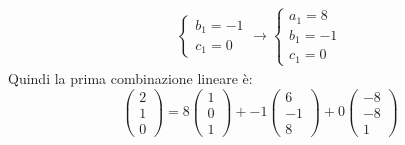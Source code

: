 \documentclass[a4paper]{article}
\begin{document}
\begin{itemize}
\begin{equation*}
\begin{array}{l}
\begin{cases}
					b_{1} = -1 \\
					c_{1} = 0
				\end{cases} \rightarrow
				\begin{cases}
					a_{1} =  8 \\
					b_{1} = -1 \\
					c_{1} =  0
				\end{cases}
			\end{array}
		\end{equation*}
		Quindi la prima combinazione lineare è:
		\begin{equation*}
			\begin{pmatrix}
				2 \\ 1 \\ 0
			\end{pmatrix} =
			8 \begin{pmatrix}
				1 \\ 0 \\ 1
			\end{pmatrix} +
			-1 \begin{pmatrix}
				6 \\ -1 \\ 8
			\end{pmatrix} +
			0 \begin{pmatrix}
				-8 \\ -8 \\ 1
			\end{pmatrix}
		\end{equation*}
		

\end{itemize}
\end{document}
